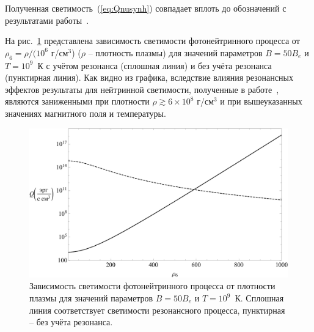 Полученная светимость~(\ref{eq:Qnusynh}) совпадает вплоть до обозначений с 
результатами работы~\cite{Yakovlev2001}.

На рис.~\ref{QsyncQphn} представлена зависимость светимости фотонейтринного процесса от $\rho_6 = \rho /(10^6$ г/см$^3$) 
($\rho$ -- плотность плазмы) для значений параметров 
$B=50 B_e$ и $T=10^9$~К с учётом резонанса (сплошная линия) и без учёта резонанса~\cite{RumChMik} (пунктирная линия). Как видно из графика, 
вследствие влияния резонансных эффектов 
результаты для нейтринной светимости, полученные в работе~\cite{%
RumChMik}, 
являются заниженными при плотности $\rho\gtrsim 6\times 10^8$ г/см$^3$ и при вышеуказанных значениях магнитного поля и температуры.

\begin{figure}[h]
\centering
\includegraphics[width=13cm,clip]{Qsyn-Qpn 1.pdf}
\caption{Зависимость светимости фотонейтринного процесса от плотности плазмы для значений параметров 
$B=50 B_e$ и $T=10^9$~К. Сплошная линия соответствует светимости резонансного процесса, пунктирная -- без учёта резонанса.}
\label{QsyncQphn}  
\end{figure}